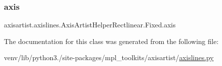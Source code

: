 \subsubsection{\texorpdfstring{axis}{axis}}
{\footnotesize\ttfamily axisartist.\+axislines.\+Axis\+Artist\+Helper\+Rectlinear.\+Fixed.\+axis}



The documentation for this class was generated from the following file\+:\begin{DoxyCompactItemize}
\item 
venv/lib/python3./site-\/packages/mpl\+\_\+toolkits/axisartist/\hyperlink{axisartist_2axislines_8py}{axislines.\+py}\end{DoxyCompactItemize}

